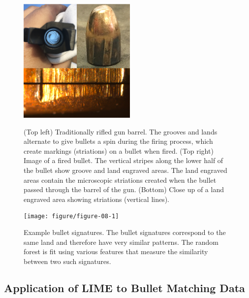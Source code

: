 \documentclass[AMS,STIX2COL]{WileyNJD-v2}\usepackage[]{graphicx}\usepackage[]{color}
\newenvironment{knitrout}{}{} %
\begin{document}
\begin{figure}[!t]
\centering
\begin{knitrout}
\color{fgcolor}

{\centering \includegraphics[width=2.25in]{figure-static/figure-07-1} 

}



\end{knitrout}
\caption{(Top left) Traditionally rifled gun barrel. The grooves and lands alternate to give bullets a spin during the firing process, which create markings (striations) on a bullet when fired. (Top right) Image of a fired bullet. The vertical stripes along the lower half of the bullet show groove and land engraved areas. The land engraved areas contain the microscopic striations created when the bullet passed through the barrel of the gun. (Bottom) Close up of a land engraved area showing striations (vertical lines).}
\label{fig:figure-07}

\vspace*{\floatsep}

\begin{knitrout}
\color{fgcolor}

{\centering \texttt{[image: figure/figure-08-1]} 

}



\end{knitrout}
\caption{Example bullet signatures. The bullet signatures correspond to the same land and therefore have very similar patterns. The \citet{hare:2017} random forest is fit using various features that measure the similarity between two such signatures.}
\label{fig:figure-08}
\end{figure}

\subsection{Application of LIME to Bullet Matching Data}
\end{document}
